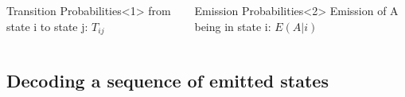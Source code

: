 \documentclass{beamer}
\begin{document}
\begin{frame}
\begin{columns}
		\begin{block}{Transition Probabilities}<1>
			from state i to state j: $T_{ij}$\\
		
		\end{block}
		\vspace{0.3cm}
		\begin{block}{Emission Probabilities}<2>
			Emission of A being in state i: $E(A|i)$
		\end{block}
\end{columns}
\end{frame}

\subsection{Decoding a sequence of emitted states}
\end{document}
